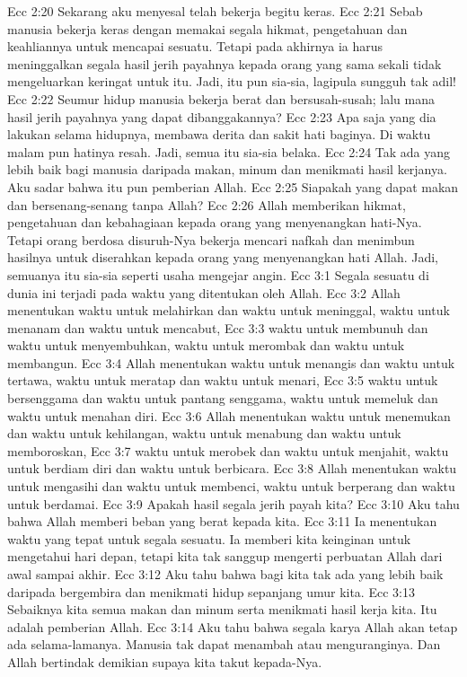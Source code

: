 Ecc 2:20  Sekarang aku menyesal telah bekerja begitu keras.
Ecc 2:21  Sebab manusia bekerja keras dengan memakai segala hikmat, pengetahuan dan keahliannya untuk mencapai sesuatu. Tetapi pada akhirnya ia harus meninggalkan segala hasil jerih payahnya kepada orang yang sama sekali tidak mengeluarkan keringat untuk itu. Jadi, itu pun sia-sia, lagipula sungguh tak adil!
Ecc 2:22  Seumur hidup manusia bekerja berat dan bersusah-susah; lalu mana hasil jerih payahnya yang dapat dibanggakannya?
Ecc 2:23  Apa saja yang dia lakukan selama hidupnya, membawa derita dan sakit hati baginya. Di waktu malam pun hatinya resah. Jadi, semua itu sia-sia belaka.
Ecc 2:24  Tak ada yang lebih baik bagi manusia daripada makan, minum dan menikmati hasil kerjanya. Aku sadar bahwa itu pun pemberian Allah.
Ecc 2:25  Siapakah yang dapat makan dan bersenang-senang tanpa Allah?
Ecc 2:26  Allah memberikan hikmat, pengetahuan dan kebahagiaan kepada orang yang menyenangkan hati-Nya. Tetapi orang berdosa disuruh-Nya bekerja mencari nafkah dan menimbun hasilnya untuk diserahkan kepada orang yang menyenangkan hati Allah. Jadi, semuanya itu sia-sia seperti usaha mengejar angin.
Ecc 3:1  Segala sesuatu di dunia ini terjadi pada waktu yang ditentukan oleh Allah.
Ecc 3:2  Allah menentukan waktu untuk melahirkan dan waktu untuk meninggal, waktu untuk menanam dan waktu untuk mencabut,
Ecc 3:3  waktu untuk membunuh dan waktu untuk menyembuhkan, waktu untuk merombak dan waktu untuk membangun.
Ecc 3:4  Allah menentukan waktu untuk menangis dan waktu untuk tertawa, waktu untuk meratap dan waktu untuk menari,
Ecc 3:5  waktu untuk bersenggama dan waktu untuk pantang senggama, waktu untuk memeluk dan waktu untuk menahan diri.
Ecc 3:6  Allah menentukan waktu untuk menemukan dan waktu untuk kehilangan, waktu untuk menabung dan waktu untuk memboroskan,
Ecc 3:7  waktu untuk merobek dan waktu untuk menjahit, waktu untuk berdiam diri dan waktu untuk berbicara.
Ecc 3:8  Allah menentukan waktu untuk mengasihi dan waktu untuk membenci, waktu untuk berperang dan waktu untuk berdamai.
Ecc 3:9  Apakah hasil segala jerih payah kita?
Ecc 3:10  Aku tahu bahwa Allah memberi beban yang berat kepada kita.
Ecc 3:11  Ia menentukan waktu yang tepat untuk segala sesuatu. Ia memberi kita keinginan untuk mengetahui hari depan, tetapi kita tak sanggup mengerti perbuatan Allah dari awal sampai akhir.
Ecc 3:12  Aku tahu bahwa bagi kita tak ada yang lebih baik daripada bergembira dan menikmati hidup sepanjang umur kita.
Ecc 3:13  Sebaiknya kita semua makan dan minum serta menikmati hasil kerja kita. Itu adalah pemberian Allah.
Ecc 3:14  Aku tahu bahwa segala karya Allah akan tetap ada selama-lamanya. Manusia tak dapat menambah atau menguranginya. Dan Allah bertindak demikian supaya kita takut kepada-Nya.

